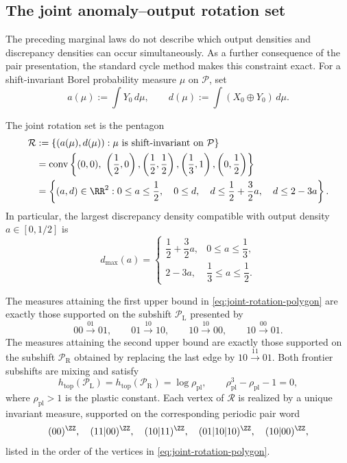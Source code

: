 \subsection{The joint anomaly--output rotation set}
\label{subsec:joint-rotation}

The preceding marginal laws do not describe which output densities and
discrepancy densities can occur simultaneously. As a further consequence of
the pair presentation, the standard cycle method makes this constraint exact.
For a shift-invariant Borel probability measure
\(\mu\) on \(\mathcal P\), set
\[
a(\mu):=\int Y_0\,d\mu,
\qquad
d(\mu):=\int (X_0\oplus Y_0)\,d\mu.
\]

\begin{theorem}
\label{thm:joint-rotation}
The joint rotation set is the pentagon
\begin{align}
\mathcal R
&:=\left\{(a(\mu),d(\mu)):
\text{\(\mu\) is shift-invariant on \(\mathcal P\)}\right\}\notag\\
&=\operatorname{conv}\left\{
(0,0),\ \left(\frac12,0\right),
\left(\frac12,\frac12\right),
\left(\frac13,1\right),
\left(0,\frac12\right)
\right\}\label{eq:joint-rotation-polygon}\\
&=\left\{(a,d)\in\RR^2:
0\le a\le\frac12,\quad 0\le d,\quad
d\le\frac12+\frac32a,\quad d\le2-3a
\right\}.\notag
\end{align}
In particular, the largest discrepancy density compatible with output density
\(a\in[0,1/2]\) is
\begin{equation}
d_{\max}(a)=
\begin{cases}
\dfrac12+\dfrac32a,&0\le a\le\dfrac13,\\[2mm]
2-3a,&\dfrac13\le a\le\dfrac12.
\end{cases}
\label{eq:max-discrepancy-profile}
\end{equation}

The measures attaining the first upper bound in
\eqref{eq:joint-rotation-polygon} are exactly those supported on the subshift
\(\mathcal P_{\mathrm L}\) presented by
\[
00\xrightarrow{01}01,\qquad
01\xrightarrow{10}10,\qquad
10\xrightarrow{10}00,\qquad
10\xrightarrow{00}01.
\]
The measures attaining the second upper bound are exactly those supported on
the subshift \(\mathcal P_{\mathrm R}\) obtained by replacing the last edge by
\(10\xrightarrow{11}01\). Both frontier subshifts are mixing and satisfy
\[
h_{\mathrm{top}}(\mathcal P_{\mathrm L})
=h_{\mathrm{top}}(\mathcal P_{\mathrm R})
=\log\rho_{\mathrm{pl}},
\qquad
\rho_{\mathrm{pl}}^3-\rho_{\mathrm{pl}}-1=0,
\]
where \(\rho_{\mathrm{pl}}>1\) is the plastic constant. Each vertex of
\(\mathcal R\) is realized by a unique invariant measure, supported on the
corresponding periodic pair word
\[
(00)^\ZZ,\quad (11|00)^\ZZ,\quad (10|11)^\ZZ,
\quad (01|10|10)^\ZZ,\quad (10|00)^\ZZ,
\]
listed in the order of the vertices in \eqref{eq:joint-rotation-polygon}.
\end{theorem}

